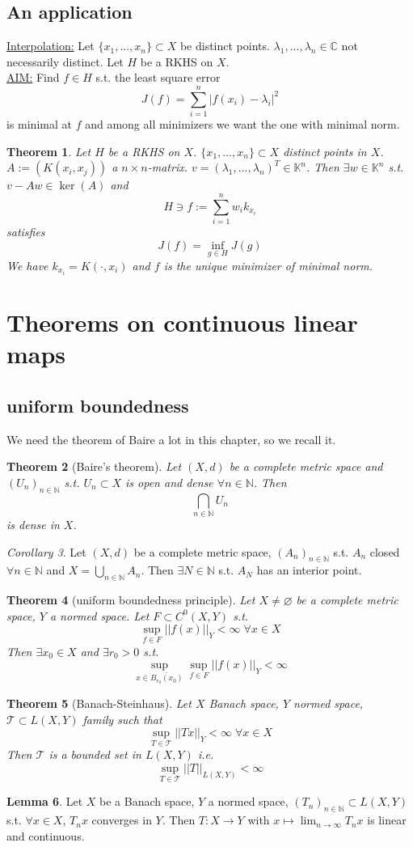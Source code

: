 \documentclass[a4paper, 12pt]{article}
\theoremstyle{plain}
\newtheorem{theorem}{Theorem}[subsection] %
\theoremstyle{definition}
\theoremstyle{lemma}
\newtheorem{lemma}[theorem]{Lemma}
\theoremstyle{remark}
\theoremstyle{corollary}
\newtheorem{corollary}[theorem]{Corollary}
\theoremstyle{example}
\begin{document}
	\subsection{An application}
	\underline{Interpolation:} Let $\{x_1,...,x_n\} \subset X$ be distinct points. $\lambda_1,...,\lambda_n \in \mathbb{C}$ not necessarily distinct. Let $H$ be a RKHS on $X$.\\
	\underline{AIM:} Find $f \in H$ s.t. the least square error \[J(f) = \sum_{i=1}^n \left|f(x_i) - \lambda_i\right|^2\] is minimal at $f$ and among all minimizers we want the one with minimal norm. 
	\begin{theorem}
		Let $H$ be a RKHS on $X$. $\{x_1,...,x_n\} \subset X$ distinct points in $X$. $A:= (K(x_i,x_j))$ a $n\times n$-matrix. $v = (\lambda_1,...,\lambda_n)^T \in \mathbb{K}^n$. Then $\exists w \in \mathbb{K}^n$ s.t. $v-Aw \in \ker(A)$ and \[H \ni f:= \sum_{i=1}^n w_ik_{x_i}\] satisfies \[J(f) = \inf_{g \in H} J(g)\] We have $k_{x_i} = K(\cdot,x_i)$ and $f$ is the unique minimizer of minimal norm. 
	\end{theorem}
	\section{Theorems on continuous linear maps}
	\subsection{uniform boundedness}
	We need the theorem of Baire a lot in this chapter, so we recall it.
	\begin{theorem}[Baire's theorem]
		Let $(X,d)$ be a complete metric space and $(U_n)_{n \in \mathbb{N}}$ s.t. $U_n \subset X$ is open and dense $\forall n \in \mathbb{N}$. Then \[\bigcap_{n \in \mathbb{N}} U_n\] is dense in $X$.
	\end{theorem}
	\begin{corollary}
		Let $(X,d)$ be a complete metric space, $(A_n)_{n \in \mathbb{N}}$ s.t. $A_n$ closed $\forall n \in \mathbb{N}$ and $X = \bigcup_{n \in \mathbb{N}}A_n$. Then $\exists N \in \mathbb{N}$ s.t. $A_N$ has an interior point.
	\end{corollary}
	\begin{theorem}[uniform boundedness principle]
		Let $X \neq \varnothing$ be a complete metric space, $Y$ a normed space. Let $F \subset C^0(X,Y)$ s.t. $$\sup_{f \in F} ||f(x)||_Y < \infty \; \forall x \in X$$ Then $\exists x_0 \in X$ and $\exists r_0 > 0$ s.t. \[\sup_{x \in \overline{B_{r_0}(x_0)}} \sup_{f \in F} ||f(x)||_Y < \infty\]
	\end{theorem}
	\begin{theorem}[Banach-Steinhaus]
		Let $X$ Banach space, $Y$ normed space, $\mathcal{T} \subset L(X,Y)$ family such that \[\sup_{T \in \mathcal{T}} ||Tx||_Y < \infty \; \forall x \in X\] Then $\mathcal{T}$ is a bounded set in $L(X,Y)$ i.e. \[\sup_{T \in \mathcal{T}} ||T||_{L(X,Y)} < \infty\]
	\end{theorem}
	\begin{lemma}
		Let $X$ be a Banach space, $Y$ a normed space, $(T_n)_{n \in \mathbb{N}} \subset L(X,Y)$ s.t. $\forall x \in X$, $T_nx$ converges in $Y$. Then $T:X\to Y$ with $x \mapsto \lim_{n \to \infty} T_nx$ is linear and continuous.
	\end{lemma}
\end{document}

